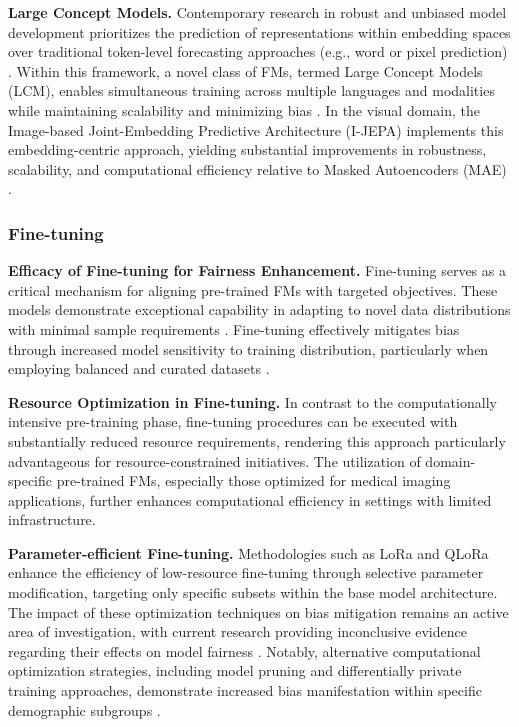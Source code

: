 \textbf{Large Concept Models.} Contemporary research in robust and unbiased model development prioritizes the prediction of representations within embedding spaces over traditional token-level forecasting approaches (e.g., word or pixel prediction) \cite{lecun_path_nodate}. Within this framework, a novel class of FMs, termed Large Concept Models (LCM), enables simultaneous training across multiple languages and modalities while maintaining scalability and minimizing bias \cite{team_large_2024}. In the visual domain, the Image-based Joint-Embedding Predictive Architecture (I-JEPA) implements this embedding-centric approach, yielding substantial improvements in robustness, scalability, and computational efficiency relative to Masked Autoencoders (MAE) \cite{assran_self-supervised_2023, littwin_how_2024}.

\subsubsection{Fine-tuning}
\label{sec:fine-tuning}
\textbf{Efficacy of Fine-tuning for Fairness Enhancement.} Fine-tuning serves as a critical mechanism for aligning pre-trained FMs with targeted objectives. These models demonstrate exceptional capability in adapting to novel data distributions with minimal sample requirements \cite{azizi_robust_2023}. Fine-tuning effectively mitigates bias through increased model sensitivity to training distribution, particularly when employing balanced and curated datasets \cite{alabdulmohsin_clip_2024}.

\textbf{Resource Optimization in Fine-tuning.} In contrast to the computationally intensive pre-training phase, fine-tuning procedures can be executed with substantially reduced resource requirements, rendering this approach particularly advantageous for resource-constrained initiatives. The utilization of domain-specific pre-trained FMs, especially those optimized for medical imaging applications, further enhances computational efficiency in settings with limited infrastructure.

\textbf{Parameter-efficient Fine-tuning.} Methodologies such as LoRa \cite{hu_lora_2021} and QLoRa \cite{dettmers_qlora_2023} enhance the efficiency of low-resource fine-tuning through selective parameter modification, targeting only specific subsets within the base model architecture. The impact of these optimization techniques on bias mitigation remains an active area of investigation, with current research providing inconclusive evidence regarding their effects on model fairness \cite{ding_fairness_2024, jin_fairmedfm_2024}. Notably, alternative computational optimization strategies, including model pruning and differentially private training approaches, demonstrate increased bias manifestation within specific demographic subgroups \cite{tran_pruning_2022, bagdasaryan_differential_2019}.

